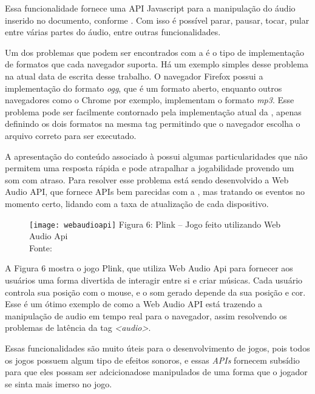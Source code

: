 Essa funcionalidade fornece uma API Javascript para a manipulação do
áudio inserido no documento, conforme
.
Com isso é possível parar, pausar, tocar,
pular entre várias partes do áudio, entre outras funcionalidades.

Um dos problemas que podem ser encontrados com a \tagaudio  é o tipo de
implementação de formatos que cada navegador suporta. Há um exemplo
simples desse problema na atual data de escrita desse trabalho. O
navegador Firefox possui a implementação do formato \textit{ogg}, que
é um formato aberto, enquanto outros navegadores como o Chrome por
exemplo, implementam o formato \textit{mp3}. Esse problema pode ser
facilmente contornado pela implementação atual da \tagaudio,
apenas definindo os dois formatos na mesma tag permitindo que o
navegador escolha o arquivo correto para ser executado.

A apresentação do conteúdo associado à \tagaudio  possui algumas particularidades que não permitem uma
resposta rápida e pode atrapalhar a jogabilidade provendo um som com
atraso. Para resolver esse problema está sendo desenvolvido a
Web Audio API, que fornece APIs bem parecidas com a \tagaudio, mas
tratando os eventos no momento certo, lidando com a taxa de
atualização de cada dispositivo.

\begin{figure}[H]
  \centering
	\texttt{[image: webaudioapi]}
	\footnotesize\hspace{8\baselineskip}
	Figura 6: Plink {--} Jogo feito utilizando Web Audio Api \\
	Fonte: 
  \label{img:webaudioapi}
\end{figure}

A Figura 6 mostra o jogo Plink, que utiliza Web
Audio Api para fornecer aos usuários uma forma divertida de interagir
entre si e criar músicas. Cada usuário controla sua posição com o
mouse, e o som gerado depende da sua posição e cor. Esse é um ótimo
exemplo de como a Web Audio API está trazendo a manipulação de audio
em tempo real para o navegador, assim resolvendo os problemas de
latência da tag \textit{<audio>}.

Essas funcionalidades são muito úteis para o desenvolvimento de jogos, pois
todos os jogos possuem algum tipo de efeitos sonoros, e essas
\textit{APIs} fornecem subsídio para que eles possam ser adcicionadose
manipulados de uma forma que o jogador se sinta mais imerso no jogo.

